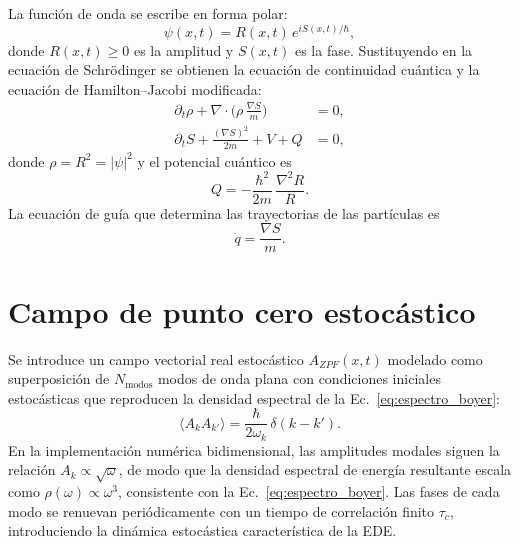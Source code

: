 \documentclass[11pt,a4paper]{article}
\begin{document}
La función de onda se escribe en forma polar:
\begin{equation}
\psi(x,t) = R(x,t)\,e^{iS(x,t)/\hbar},
\label{eq:psi_polar}
\end{equation}
donde $R(x,t)\geq 0$ es la amplitud y $S(x,t)$ es la fase. Sustituyendo
en la ecuación de Schrödinger se obtienen la ecuación de continuidad
cuántica y la ecuación de Hamilton--Jacobi modificada:
\begin{align}
\partial_t\rho + \nabla\cdot\!\Big(\rho\,\frac{\nabla S}{m}\Big) &= 0, \label{eq:continuidad}\\
\partial_t S + \frac{(\nabla S)^2}{2m} + V + Q &= 0, \label{eq:HJ}
\end{align}
donde $\rho = R^2 = |\psi|^2$ y el potencial cuántico es
\begin{equation}
Q = -\frac{\hbar^2}{2m}\,\frac{\nabla^2 R}{R}.
\label{eq:Q}
\end{equation}
La ecuación de guía que determina las trayectorias de las partículas es
\begin{equation}
\dot{q} = \frac{\nabla S}{m}.
\label{eq:guia}
\end{equation}

\section{Campo de punto cero estocástico}
\label{sec:zpf}

Se introduce un campo vectorial real estocástico $A_{ZPF}(x,t)$ modelado
como superposición de $N_\text{modos}$ modos de onda plana con
condiciones iniciales estocásticas que reproducen la densidad espectral
de la Ec.~\eqref{eq:espectro_boyer}:
\begin{equation}
\langle A_k A_{k'}\rangle = \frac{\hbar}{2\omega_k}\,\delta(k-k').
\label{eq:correlacion_modos}
\end{equation}
En la implementación numérica bidimensional, las amplitudes modales
siguen la relación $A_k\propto\sqrt{\omega}$, de modo que la densidad
espectral de energía resultante escala como $\rho(\omega)\propto\omega^3$,
consistente con la Ec.~\eqref{eq:espectro_boyer}. Las fases de cada modo
se renuevan periódicamente con un tiempo de correlación finito $\tau_c$,
introduciendo la dinámica estocástica característica de la EDE.
\end{document}
